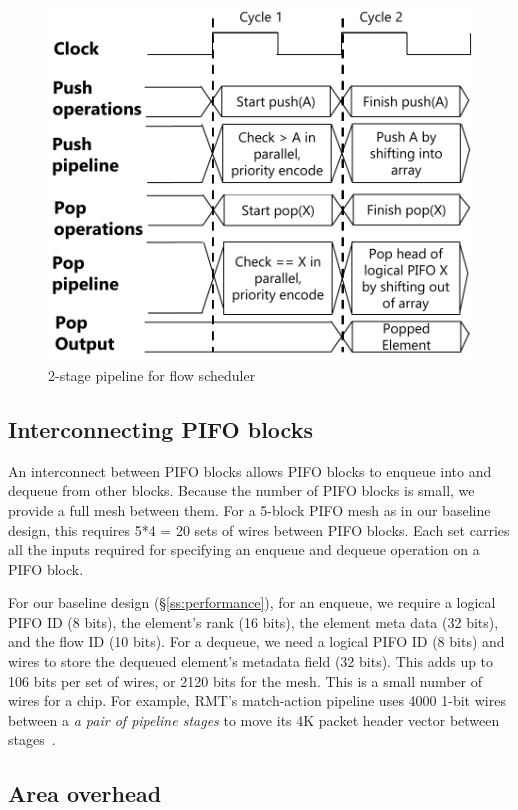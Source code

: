 \begin{figure}[!t]
  \centering
  \includegraphics[width=0.6\columnwidth]{pifo_2stage_pipeline.pdf}
  \caption{2-stage pipeline for flow scheduler}
  \label{fig:2stage}
\end{figure}

\subsection{Interconnecting PIFO blocks}
\label{ss:interconnect}

An interconnect between PIFO blocks allows PIFO blocks to enqueue into and
dequeue from other blocks. Because the number of PIFO blocks is small, we
provide a full mesh between them. For a 5-block PIFO mesh as in our baseline design, this requires
5*4 = 20 sets of wires between PIFO blocks. Each set carries all the inputs
required for specifying an enqueue and dequeue operation on a PIFO block.

For our baseline design (\S\ref{ss:performance}), for an enqueue, we require a logical PIFO ID (8 bits),
the element's rank (16 bits), the element meta data (32 bits), and the flow ID
(10 bits). For a dequeue, we need a logical PIFO ID (8 bits) and wires to store
the dequeued element's metadata field (32 bits).  This adds up to 106 bits per set of wires, or
2120 bits for the mesh. This is a small number of wires for a
chip.  For example, RMT's match-action pipeline uses 4000 1-bit wires between a
{\em a pair of pipeline stages} to move its 4K packet header vector between
stages~\cite{rmt}. 

\subsection{Area overhead}
\label{ss:feasibility}


